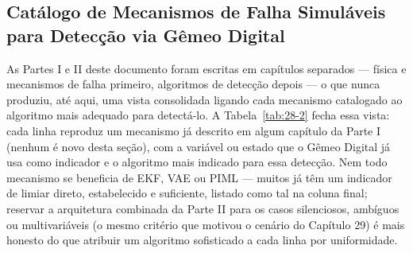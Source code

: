 \documentclass[12pt,a4paper]{article}
\numberwithin{equation}{section}
\numberwithin{table}{section}
\numberwithin{figure}{section}
\begin{document}
{\subsection{Catálogo de Mecanismos de Falha Simuláveis para Detecção via Gêmeo Digital}

As Partes I e II deste documento foram escritas em capítulos separados — física e mecanismos de falha primeiro, algoritmos de detecção depois — o que nunca produziu, até aqui, uma vista consolidada ligando cada mecanismo catalogado ao algoritmo mais adequado para detectá-lo. A Tabela~\ref{tab:28-2} fecha essa vista: cada linha reproduz um mecanismo já descrito em algum capítulo da Parte I (nenhum é novo desta seção), com a variável ou estado que o Gêmeo Digital já usa como indicador e o algoritmo mais indicado para essa detecção. Nem todo mecanismo se beneficia de EKF, VAE ou PIML — muitos já têm um indicador de limiar direto, estabelecido e suficiente, listado como tal na coluna final; reservar a arquitetura combinada da Parte II para os casos silenciosos, ambíguos ou multivariáveis (o mesmo critério que motivou o cenário do Capítulo 29) é mais honesto do que atribuir um algoritmo sofisticado a cada linha por uniformidade.

}
\end{document}
